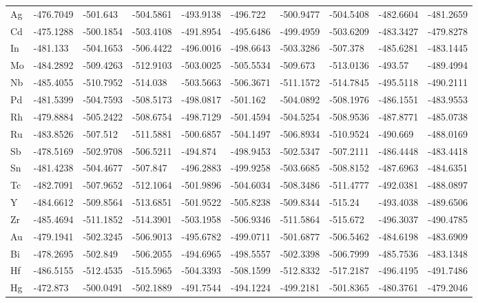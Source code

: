 \begin{table}[h]
{\begin{tabular}{*{10}{l}}
    Ag & -476.7049 & -501.643  & -504.5861 & -493.9138 & -496.722  & -500.9477 & -504.5408 & -482.6604 & -481.2659 \\
    Cd & -475.1288 & -500.1854 & -503.4108 & -491.8954 & -495.6486 & -499.4959 & -503.6209 & -483.3427 & -479.8278 \\
    In & -481.133  & -504.1653 & -506.4422 & -496.0016 & -498.6643 & -503.3286 & -507.378  & -485.6281 & -483.1445 \\
    Mo & -484.2892 & -509.4263 & -512.9103 & -503.0025 & -505.5534 & -509.673  & -513.0136 & -493.57   & -489.4994 \\
    Nb & -485.4055 & -510.7952 & -514.038  & -503.5663 & -506.3671 & -511.1572 & -514.7845 & -495.5118 & -490.2111 \\
    Pd & -481.5399 & -504.7593 & -508.5173 & -498.0817 & -501.162  & -504.0892 & -508.1976 & -486.1551 & -483.9553 \\
    Rh & -479.8884 & -505.2422 & -508.6754 & -498.7129 & -501.4594 & -504.5254 & -508.9536 & -487.8771 & -485.0738 \\
    Ru & -483.8526 & -507.512  & -511.5881 & -500.6857 & -504.1497 & -506.8934 & -510.9524 & -490.669  & -488.0169 \\
    Sb & -478.5169 & -502.9708 & -506.5211 & -494.874  & -498.9453 & -502.5347 & -507.2111 & -486.4448 & -483.4418 \\
    Sn & -481.4238 & -504.4677 & -507.847  & -496.2883 & -499.9258 & -503.6685 & -508.8152 & -487.6963 & -484.6351 \\
    Tc & -482.7091 & -507.9652 & -512.1064 & -501.9896 & -504.6034 & -508.3486 & -511.4777 & -492.0381 & -488.0897 \\
    Y  & -484.6612 & -509.8564 & -513.6851 & -501.9522 & -505.8238 & -509.8344 & -515.24   & -493.4038 & -489.6506 \\
    Zr & -485.4694 & -511.1852 & -514.3901 & -503.1958 & -506.9346 & -511.5864 & -515.672  & -496.3037 & -490.4785 \\
    Au & -479.1941 & -502.3245 & -506.9013 & -495.6782 & -499.0711 & -501.6877 & -506.5462 & -484.6198 & -483.6909 \\
    Bi & -478.2695 & -502.849  & -506.2055 & -494.6965 & -498.5557 & -502.3398 & -506.7999 & -485.7536 & -483.1348 \\
    Hf & -486.5155 & -512.4535 & -515.5965 & -504.3393 & -508.1599 & -512.8332 & -517.2187 & -496.4195 & -491.7486 \\
    Hg & -472.873  & -500.0491 & -502.1889 & -491.7544 & -494.1224 & -499.2181 & -501.8365 & -480.3761 & -479.2046 \\

\end{tabular}}
\end{table}
